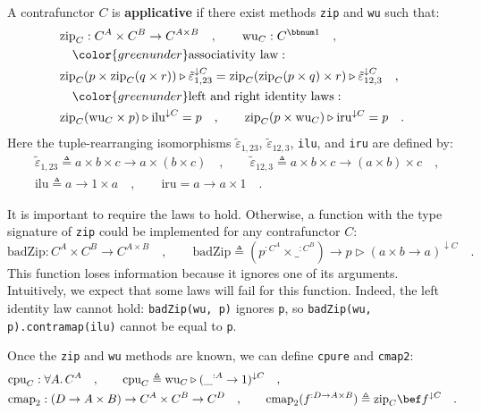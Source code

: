 A contrafunctor $C$ is \textbf{applicative} if there exist methods
\lstinline!zip! and \lstinline!wu! such that:
\begin{align}
 & \text{zip}_{C}:C^{A}\times C^{B}\rightarrow C^{A\times B}\quad,\quad\quad\text{wu}_{C}:C^{\bbnum 1}\quad,\nonumber \\
 & \quad{\color{greenunder}\text{associativity law}:}\quad\nonumber \\
 & \text{zip}_{C}(p\times\text{zip}_{C}(q\times r))\triangleright\tilde{\varepsilon}_{1,23}^{\downarrow C}=\text{zip}_{C}(\text{zip}_{C}(p\times q)\times r)\triangleright\tilde{\varepsilon}_{12,3}^{\downarrow C}\quad,\label{eq:applicative-contrafunctor-associativity-law}\\
 & \quad{\color{greenunder}\text{left and right identity laws}:}\quad\nonumber \\
 & \text{zip}_{C}(\text{wu}_{C}\times p)\triangleright\text{ilu}^{\downarrow C}=p\quad,\quad\quad\text{zip}_{C}(p\times\text{wu}_{C})\triangleright\text{iru}^{\downarrow C}=p\quad.\label{eq:applicative-contrafunctor-identity-laws}
\end{align}
Here the tuple-rearranging isomorphisms $\tilde{\varepsilon}_{1,23}$,
$\tilde{\varepsilon}_{12,3}$, \lstinline!ilu!, and \lstinline!iru!
are defined by:
\begin{align*}
 & \tilde{\varepsilon}_{1,23}\triangleq a\times b\times c\rightarrow a\times\left(b\times c\right)\quad,\quad\quad\tilde{\varepsilon}_{12,3}\triangleq a\times b\times c\rightarrow\left(a\times b\right)\times c\quad,\\
 & \text{ilu}\triangleq a\rightarrow1\times a\quad,\quad\quad\text{iru}=a\rightarrow a\times1\quad.
\end{align*}

It is important to require the laws to hold. Otherwise, a function
with the type signature of \lstinline!zip! could be implemented for
any contrafunctor $C$:
\[
\text{badZip}:C^{A}\times C^{B}\rightarrow C^{A\times B}\quad,\quad\quad\text{badZip}\triangleq(p^{:C^{A}}\times\_^{:C^{B}})\rightarrow p\triangleright(a\times b\rightarrow a)^{\downarrow C}\quad.
\]
This function loses information because it ignores one of its arguments.
Intuitively, we expect that some laws will fail for this function.
Indeed, the left identity law cannot hold: \lstinline!badZip(wu, p)!
ignores \lstinline!p!, so \lstinline!badZip(wu, p).contramap(ilu)!
cannot be equal to \lstinline!p!. 

Once the \lstinline!zip! and \lstinline!wu! methods are known, we
can define \lstinline!cpure! and \lstinline!cmap2!:
\begin{align*}
 & \text{cpu}_{C}:\forall A.\,C^{A}\quad,\quad\quad\text{cpu}_{C}\triangleq\text{wu}_{C}\triangleright(\_^{:A}\rightarrow1)^{\downarrow C}\quad,\\
 & \text{cmap}_{2}:(D\rightarrow A\times B)\rightarrow C^{A}\times C^{B}\rightarrow C^{D}\quad,\quad\quad\text{cmap}_{2}(f^{:D\rightarrow A\times B})\triangleq\text{zip}_{C}\bef f^{\downarrow C}\quad.
\end{align*}

